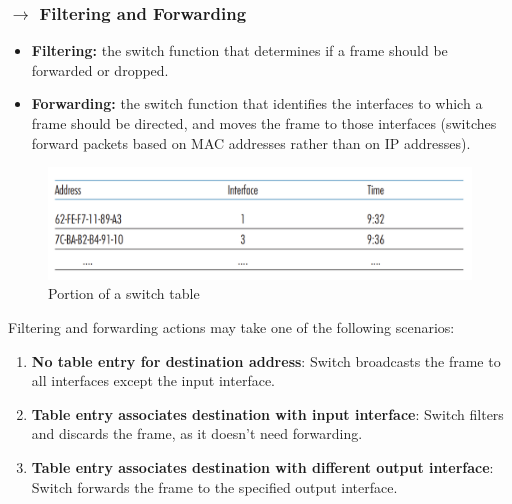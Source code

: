 \subsubsection[5.5.1 Filtering and Forwarding]{$\rightarrow$ Filtering and Forwarding}

\begin{itemize}
    \item \textbf{Filtering:} the switch function that determines if a frame should be forwarded or dropped.
    
    \item \textbf{Forwarding:} the switch function that identifies the interfaces to which a frame should be directed, and moves the frame to those interfaces (switches forward packets based on MAC addresses rather than on IP addresses).
\end{itemize}

\vspace{-1em}
\begin{figure}[H]
    \centering
    \includegraphics[width = 0.9\linewidth]{img/5/switch-table.png}
    \caption{Portion of a switch table}
    \label{fig:switch-table}
\end{figure}

\vspace{-0.25em}
\noindent Filtering and forwarding actions may take one of the following scenarios:
\begin{enumerate}
    \item \textbf{No table entry for destination address}: Switch broadcasts the frame to all interfaces except the input interface.
    
    \item \textbf{Table entry associates destination with input interface}: Switch filters and discards the frame, as it doesn't need forwarding.
    
    \item \textbf{Table entry associates destination with different output interface}: Switch forwards the frame to the specified output interface.
\end{enumerate}

